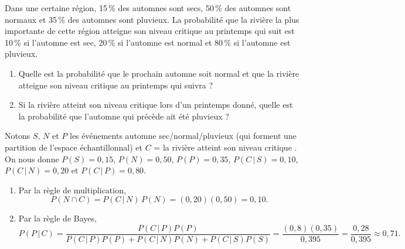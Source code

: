\begin{exercice}
Dans une certaine région, 15\,\% des automnes sont secs, 50\,\% des automnes sont normaux et
35\,\% des automnes sont pluvieux. La probabilité que la rivière la plus importante de cette
région atteigne son niveau critique au printemps qui suit est 10\,\% si l'automne est sec,
20\,\% si l'automne est normal et 80\,\% si l'automne est pluvieux.
\begin{enumerate}[label=(\alph*)]
  \item Quelle est la probabilité que le prochain automne soit normal et que la rivière
  atteigne son niveau critique au printemps qui suivra ?
  \item Si la rivière atteint son niveau critique lors d'un printemps donné, quelle est la
  probabilité que l'automne qui précède ait été pluvieux ?
\end{enumerate}
\begin{solution}
Notons $S$, $N$ et $P$ les événements \og automne sec/normal/pluvieux \fg{} (qui forment une
partition de l'espace échantillonnal) et $C$ = \og la rivière atteint son niveau critique \fg.
On nous donne $P(S)=0,15$, $P(N)=0,50$, $P(P)=0,35$, $P(C\,|\,S)=0,10$, $P(C\,|\,N)=0,20$ et
$P(C\,|\,P)=0,80$.
\begin{enumerate}[label=(\alph*)]
  \item Par la règle de multiplication,
  \[
    P(N\cap C)=P(C\,|\,N)\,P(N)=(0,20)(0,50)=0,10.
  \]
  \item Par la règle de Bayes,
  \[
    P(P\,|\,C)=\frac{P(C\,|\,P)P(P)}{P(C\,|\,P)P(P)+P(C\,|\,N)P(N)+P(C\,|\,S)P(S)}
    =\frac{(0,8)(0,35)}{0,395}=\frac{0,28}{0,395}\approx 0,71.
  \]
\end{enumerate}
\end{solution}
\end{exercice}

